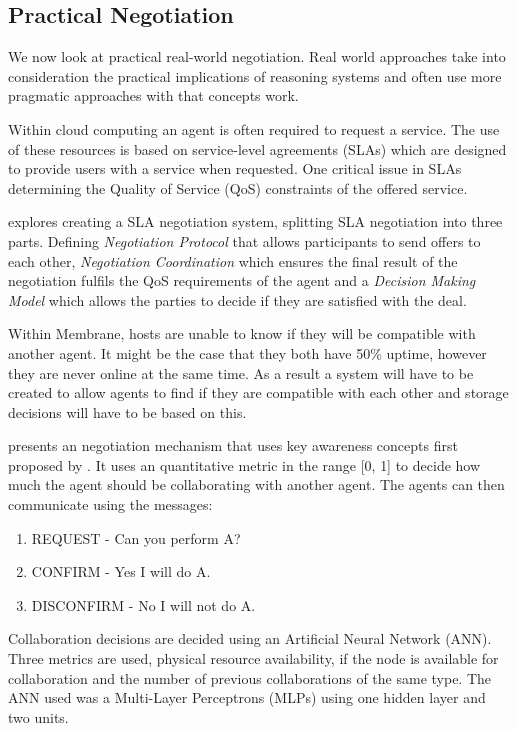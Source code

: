 \documentclass[11pt, a4paper, twocolumn, twoside]{report}
\begin{document}
\subsection{Practical Negotiation}

We now look at practical real-world negotiation. Real world approaches take into consideration the practical implications of reasoning systems and often use more pragmatic approaches with that concepts work.

Within cloud computing an agent is often required to request a service. The use of these resources is based on service-level agreements (SLAs) which are designed to provide users with a service when requested. \citep{paletta2009mas} One critical issue in SLAs determining the Quality of Service (QoS) constraints of the offered service.

\cite{yan2007autonomous} explores creating a SLA negotiation system, splitting SLA negotiation into three parts. Defining \emph{Negotiation Protocol} that allows participants to send offers to each other, \emph{Negotiation Coordination} which ensures the final result of the negotiation fulfils the QoS requirements of the agent and a \emph{Decision Making Model} which allows the parties to decide if they are satisfied with the deal.

Within Membrane, hosts are unable to know if they will be compatible with another agent. It might be the case that they both have 50\% uptime, however they are never online at the same time. As a result a system will have to be created to allow agents to find if they are compatible with each other and storage decisions will have to be based on this.

\cite{paletta2009mas} presents an negotiation mechanism that uses key awareness concepts first proposed by \cite{herrero2007agents}. It uses an quantitative metric in the range [0, 1] to decide how much the agent should be collaborating with another agent. The agents can then communicate using the messages:

\begin{enumerate}
 \item REQUEST - Can you perform A?
 \item CONFIRM - Yes I will do A.
 \item DISCONFIRM - No I will not do A.
\end{enumerate}

Collaboration decisions are decided using an Artificial Neural Network (ANN). Three metrics are used, physical resource availability, if the node is available for collaboration and the number of previous collaborations of the same type. The ANN used was a Multi-Layer Perceptrons (MLPs) using one hidden layer and two units.
\end{document}
